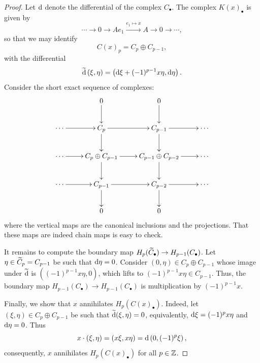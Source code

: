 \begin{proof}
    Let $\mathrm{d}$ denote the differential of the complex $C_\bullet$. The complex $K(x)_\bullet$ is given by 
    \begin{equation*}
        \cdots\to 0 \to A e_1\xrightarrow{e_1\mapsto x} A\to 0\to\cdots,
    \end{equation*}
    so that we may identify
    \begin{equation*}
        C(x)_p = C_p\oplus C_{p - 1},
    \end{equation*}
    with the differential 
    \begin{equation*}
        \widetilde{\mathrm{d}}\left(\xi, \eta\right) = \left(\mathrm{d}\xi + (-1)^{p - 1} x\eta, \mathrm{d}\eta\right).
    \end{equation*}
    Consider the short exact sequence of complexes: 
    \begin{equation*}
        \xymatrix{
            & 0\ar[d] & 0\ar[d] & \\
            \cdots\ar[r] & C_p\ar[r]\ar[d] & C_{p - 1}\ar[d]\ar[r] & \cdots\\
            \cdots\ar[r] & C_p\oplus C_{p - 1}\ar[r]\ar[d] & C_{p - 1}\oplus C_{p - 2}\ar[r]\ar[d] & \cdots\\
            \cdots\ar[r] & C_{p - 1}\ar[r]\ar[d] & C_{p - 2}\ar[r]\ar[d] & \cdots\\
            & 0 & 0 & 
        }
    \end{equation*}
    where the vertical maps are the canonical inclusions and the projections. That these maps are indeed chain maps is easy to check. 
    
    It remains to compute the boundary map $H_p(\widetilde{C}_\bullet)\to H_{p - 1}(C_\bullet)$. Let $\eta\in\widetilde{C}_p = C_{p -1}$ be such that $\mathrm{d} \eta = 0$. Consider $(0, \eta)\in C_p\oplus C_{p - 1}$ whose image under $\widetilde{\mathrm{d}}$ is $\left((-1)^{p - 1}x\eta, 0\right)$, which lifts to $(-1)^{p - 1}x\eta\in C_{p - 1}$. Thus, the boundary map $H_{p - 1}(C_\bullet)\to H_{p - 1}(C_\bullet)$ is multiplication by $(-1)^{p - 1}x$.

    Finally, we show that $x$ annihilates $H_p\left(C(x)_\bullet\right)$. Indeed, let $(\xi, \eta)\in C_p\oplus C_{p - 1}$ be such that $\widetilde{\mathrm{d}}(\xi, \eta) = 0$, equivalently, $\mathrm{d}\xi = (-1)^p x\eta$ and $\mathrm{d}\eta = 0$. Thus 
    \begin{equation*}
        x\cdot(\xi, \eta) = (x\xi, x\eta) = \mathrm{d}\left(0, (-1)^p\xi\right),
    \end{equation*}
    consequently, $x$ annihilates $H_p(C(x)_\bullet)$ for all $p\in\mathbb{Z}$. 
\end{proof}

